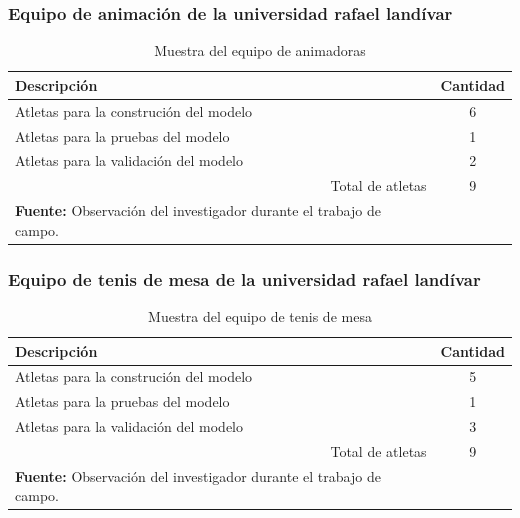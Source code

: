 \subsubsection{Equipo de animaci\'on de la universidad rafael land\'ivar} \label{sj:1t:ani}
\begin{table}[H]
\begin{center}
\caption{Muestra del equipo de animadoras}
\label{tab:MuestraCheerleaders}
\begin{tabular}{lc}
\hline
\multicolumn{1}{|l|}{\textbf{Descripci\'on}} & \multicolumn{1}{l|}{\textbf{Cantidad}} \\ \hline
\multicolumn{1}{|l|}{Atletas para la construci\'on del modelo} & \multicolumn{1}{c|}{6} \\ \hline
\multicolumn{1}{|l|}{Atletas para la pruebas del modelo} & \multicolumn{1}{c|}{1} \\ \hline
\multicolumn{1}{|l|}{Atletas para la validaci\'on del modelo} & \multicolumn{1}{c|}{2} \\ \hline
\multicolumn{1}{|r|}{Total de atletas} & \multicolumn{1}{c|}{9} \\ \hline
\textbf{Fuente:} Observaci\'on del investigador durante el trabajo de campo.
\end{tabular}
\end{center}
\end{table}
\subsubsection{Equipo de tenis de mesa de la universidad rafael land\'ivar}\label{sj:1t:ten}
\begin{table}[H]
\begin{center}
\caption{Muestra del equipo de tenis de mesa}
\label{tab:MuestraTenis}
\begin{tabular}{lc}
\hline
\multicolumn{1}{|l|}{\textbf{Descripci\'on}} & \multicolumn{1}{l|}{\textbf{Cantidad}} \\ \hline
\multicolumn{1}{|l|}{Atletas para la construci\'on del modelo} & \multicolumn{1}{c|}{5} \\ \hline
\multicolumn{1}{|l|}{Atletas para la pruebas del modelo} & \multicolumn{1}{c|}{1} \\ \hline
\multicolumn{1}{|l|}{Atletas para la validaci\'on del modelo} & \multicolumn{1}{c|}{3} \\ \hline
\multicolumn{1}{|r|}{Total de atletas} & \multicolumn{1}{c|}{9} \\ \hline
\textbf{Fuente:} Observaci\'on del investigador durante el trabajo de campo.
\end{tabular}
\end{center}
\end{table}

